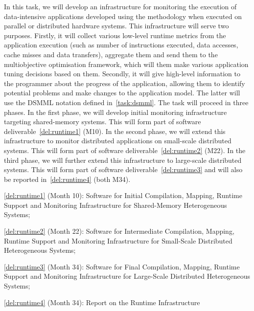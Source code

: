 \begin{Workpackage}{\thewpno}
\begin{Task}
\TaskResults{
\ref{del:runtime1}
\ref{del:runtime2}
\ref{del:runtime3}
\ref{del:runtime4}
}%
\TaskHeader{}
\label{task:monitoring}
In this task, we will develop an infrastructure for monitoring the execution of  data-intensive applications developed using the \TheProject{} methodology when executed on parallel or distributed  hardware systems. This infrastructure will serve two purposes. Firstly, it will collect various low-level runtime metrics from the application execution (such as number of instructions executed, data accesses, cache misses and data transfers), aggregate them and send them to the multiobjective optimisation framework, which will them make various application tuning decisions based on them. Secondly, it will give high-level information to the programmer about the progress of the application, allowing them to identify potential problems and make changes to the application model. The latter will use the DSMML notation defined in~\ref{task:dsmml}. The task will proceed in three phases. In the first phase, we will develop initial monitoring infrastructure targeting shared-memory systems. This will form part of software deliverable~\ref{del:runtime1} (M10). In the second phase, we will extend this infrastructure to monitor distributed applications on small-scale distributed systems. This will form part of software deliverable~\ref{del:runtime2} (M22). In the third phase, we will further extend this infrastructure to large-scale distributed systems. This will form part of software deliverable~\ref{del:runtime3} and will also be reported in~\ref{del:runtime4} (both M34).
\end{Task}



\vspace{-10pt}
\begin{WPDeliverables}
\begin{compactitem}
\item \ref{del:runtime1} (Month 10): Software for Initial \TheProject{} Compilation, Mapping, Runtime Support and Monitoring Infrastructure for Shared-Memory Heterogeneous Systems;
\item \ref{del:runtime2} (Month 22): Software for Intermediate \TheProject{} Compilation, Mapping, Runtime Support and Monitoring Infrastructure for Small-Scale Distributed Heterogeneous Systems;
\item \ref{del:runtime3} (Month 34): Software for Final \TheProject{} Compilation, Mapping, Runtime Support and Monitoring Infrastructure for Large-Scale Distributed Heterogeneous Systems;
\item \ref{del:runtime4} (Month 34): Report on the \TheProject{} Runtime Infrastructure
\end{compactitem}



\end{WPDeliverables}
\end{Workpackage}
